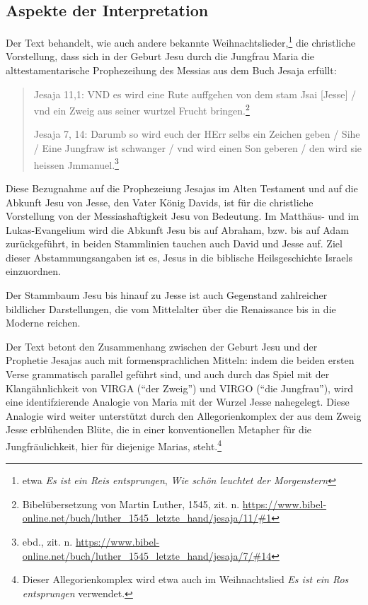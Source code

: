 \documentclass[a4paper]{book}
\begin{document}
\pagebreak

\begin{samepage}

\subsection{Aspekte der Interpretation}

\begin{multicols}{2}

Der Text behandelt, wie auch andere bekannte Weihnachtslieder,\footnote{etwa \emph{Es ist ein Reis entsprungen}, \emph{Wie schön leuchtet der Morgenstern}} die christliche Vorstellung, dass sich in der Geburt Jesu durch die Jungfrau Maria die alttestamentarische Prophezeihung des Messias aus dem Buch Jesaja erfüllt: 

\begin{quote}
Jesaja 11,1: VND es wird eine Rute auffgehen von dem stam Jsai [Jesse] / vnd ein Zweig aus seiner wurtzel Frucht bringen.\footnote{Bibelübersetzung von Martin Luther, 1545, zit. n. \url{https://www.bibel-online.net/buch/luther_1545_letzte_hand/jesaja/11/\#1}}

Jesaja 7, 14: Darumb so wird euch der HErr selbs ein Zeichen geben / Sihe / Eine Jungfraw ist schwanger / vnd wird einen Son geberen / den wird sie heissen Jmmanuel.\footnote{ebd., zit. n. \url{https://www.bibel-online.net/buch/luther_1545_letzte_hand/jesaja/7/\#14}}
\end{quote}

Diese Bezugnahme auf die Prophezeiung Jesajas im Alten Testament und auf die Abkunft Jesu von Jesse, den Vater König Davids, ist für die christliche Vorstellung von der Messiashaftigkeit Jesu von Bedeutung. Im Matthäus- und im Lukas-Evangelium wird die Abkunft Jesu bis auf Abraham, bzw. bis auf Adam zurückgeführt, in beiden Stammlinien tauchen auch David und Jesse auf. Ziel dieser Abstammungsangaben ist es, Jesus in die biblische Heilsgeschichte Israels einzuordnen. 

Der Stammbaum Jesu bis hinauf zu Jesse ist auch Gegenstand zahlreicher bildlicher Darstellungen, die vom Mittelalter über die Renaissance bis in die Moderne reichen.

Der Text betont den Zusammenhang zwischen der Geburt Jesu und der Prophetie Jesajas auch mit formensprachlichen Mitteln: indem die beiden ersten Verse grammatisch parallel geführt sind, und auch durch das Spiel mit der Klangähnlichkeit von VIRGA (\enquote{der Zweig}) und VIRGO (\enquote{die Jungfrau}), wird eine identifzierende Analogie von Maria mit der Wurzel Jesse nahegelegt. Diese Analogie wird weiter unterstützt durch den Allegorienkomplex der aus dem Zweig Jesse erblühenden Blüte, die in einer konventionellen Metapher für die Jungfräulichkeit, hier für diejenige Marias, steht.\footnote{Dieser Allegorienkomplex wird etwa auch im Weihnachtslied \emph{Es ist ein Ros entsprungen} verwendet.}

\end{multicols}

\end{samepage}
\end{document}

